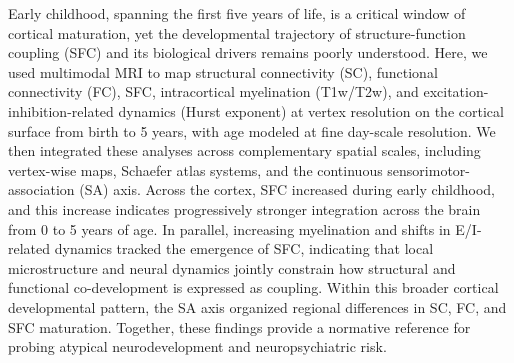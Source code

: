 
Early childhood, spanning the first five years of life, is a critical window of cortical maturation, yet the developmental trajectory of structure-function coupling (SFC) and its biological drivers remains poorly understood. Here, we used multimodal MRI to map structural connectivity (SC), functional connectivity (FC), SFC, intracortical myelination (T1w/T2w), and excitation-inhibition-related dynamics (Hurst exponent) at vertex resolution on the cortical surface from birth to 5 years, with age modeled at fine day-scale resolution. We then integrated these analyses across complementary spatial scales, including vertex-wise maps, Schaefer atlas systems, and the continuous sensorimotor-association (SA) axis. Across the cortex, SFC increased during early childhood, and this increase indicates progressively stronger integration across the brain from 0 to 5 years of age. In parallel, increasing myelination and shifts in E/I-related dynamics tracked the emergence of SFC, indicating that local microstructure and neural dynamics jointly constrain how structural and functional co-development is expressed as coupling. Within this broader cortical developmental pattern, the SA axis organized regional differences in SC, FC, and SFC maturation. Together, these findings provide a normative reference for probing atypical neurodevelopment and neuropsychiatric risk.

